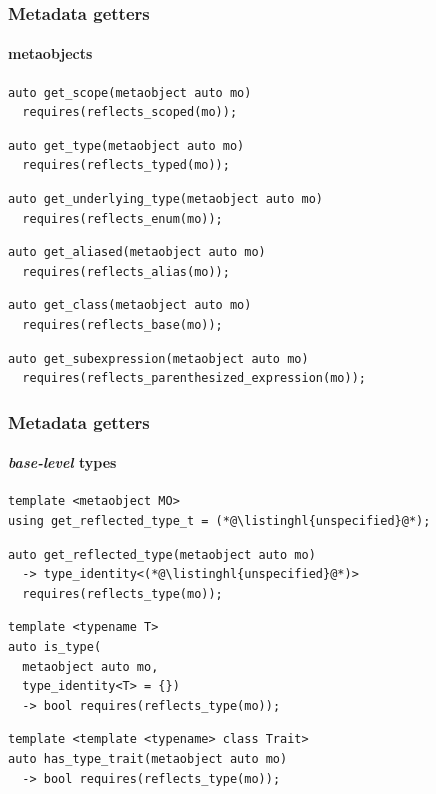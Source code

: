 \documentclass[compress,table,xcolor=table]{beamer}
\begin{document}
\begin{frame}[fragile]
  \frametitle{Metadata getters}
  \framesubtitle{metaobjects}
 \begin{lstlisting}[language=c++2x,basicstyle=\small\ttfamily]
auto get_scope(metaobject auto mo)
  requires(reflects_scoped(mo));
  \end{lstlisting}
  \vfill
  \begin{lstlisting}[language=c++2x,basicstyle=\small\ttfamily]
auto get_type(metaobject auto mo)
  requires(reflects_typed(mo));
  \end{lstlisting}
  \vfill
  \begin{lstlisting}[language=c++2x,basicstyle=\small\ttfamily]
auto get_underlying_type(metaobject auto mo)
  requires(reflects_enum(mo));
  \end{lstlisting}
  \vfill
  \begin{lstlisting}[language=c++2x,basicstyle=\small\ttfamily]
auto get_aliased(metaobject auto mo)
  requires(reflects_alias(mo));
  \end{lstlisting}
  \vfill
  \begin{lstlisting}[language=c++2x,basicstyle=\small\ttfamily]
auto get_class(metaobject auto mo)
  requires(reflects_base(mo));
  \end{lstlisting}
  \vfill
  \begin{lstlisting}[language=c++2x,basicstyle=\footnotesize\ttfamily]
auto get_subexpression(metaobject auto mo)
  requires(reflects_parenthesized_expression(mo));
  \end{lstlisting}
\end{frame}
\begin{frame}[fragile]
  \frametitle{Metadata getters}
  \framesubtitle{{\em base-level} types}
 \begin{lstlisting}[language=c++2x,basicstyle=\small\ttfamily]
template <metaobject MO>
using get_reflected_type_t = (*@\listinghl{unspecified}@*);
  \end{lstlisting}
  \vfill
  \begin{lstlisting}[language=c++2x,basicstyle=\small\ttfamily]
auto get_reflected_type(metaobject auto mo)
  -> type_identity<(*@\listinghl{unspecified}@*)>
  requires(reflects_type(mo));
  \end{lstlisting}
  \vfill
  \begin{lstlisting}[language=c++2x,basicstyle=\small\ttfamily]
template <typename T>
auto is_type(
  metaobject auto mo,
  type_identity<T> = {})
  -> bool requires(reflects_type(mo));
  \end{lstlisting}
  \vfill
  \begin{lstlisting}[language=c++2x,basicstyle=\small\ttfamily]
template <template <typename> class Trait>
auto has_type_trait(metaobject auto mo)
  -> bool requires(reflects_type(mo));
  \end{lstlisting}
\end{frame}
\end{document}
